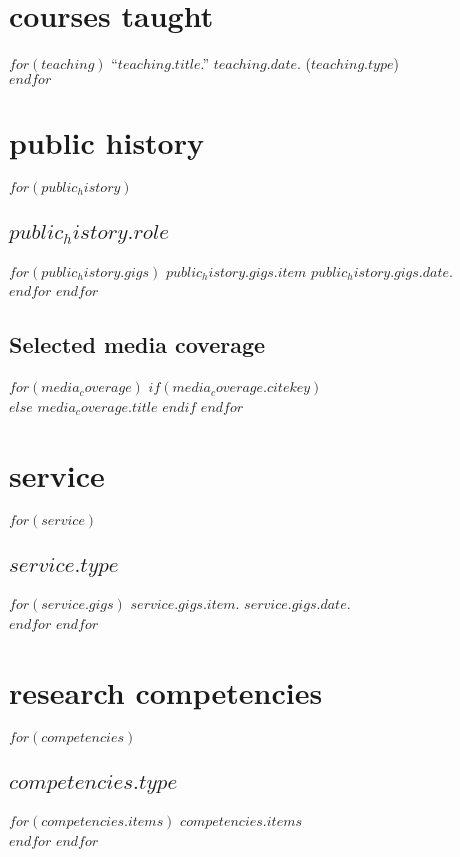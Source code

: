 \documentclass[11pt, letter]{article}
\begin{document}
\section{courses taught}

$for(teaching)$
``$teaching.title$.'' $teaching.date$. ($teaching.type$)\\[.15cm]
$endfor$


\section{public history}

$for(public_history)$
\subsection{$public_history.role$}
$for(public_history.gigs)$
$public_history.gigs.item$ $public_history.gigs.date$.\\[.15cm]
$endfor$
$endfor$
\subsection{Selected media coverage}

$for(media_coverage)$
$if(media_coverage.citekey)$
\\
$else$
$media_coverage.title$
$endif$
$endfor$


\section{service}
$for(service)$
\subsection{$service.type$}
$for(service.gigs)$
$service.gigs.item$. $service.gigs.date$.\\[.15cm]
$endfor$
$endfor$


\section{research competencies}
$for(competencies)$
\subsection{$competencies.type$}
$for(competencies.items)$
$competencies.items$\\[.15cm]
$endfor$
$endfor$
\end{document}
